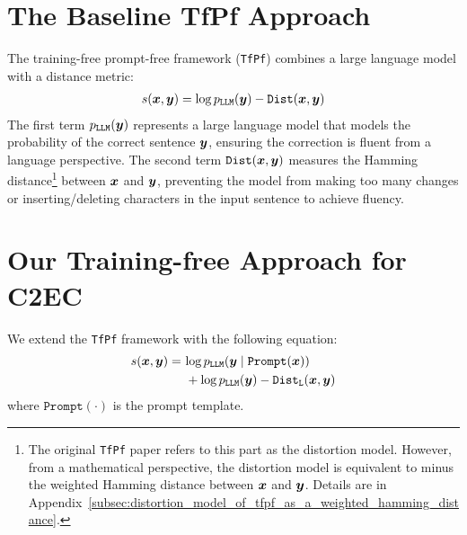 \section{The Baseline TfPf Approach}
\label{sec:baseline_tfpf_approach}
The training-free prompt-free framework (\texttt{TfPf}) \cite{zhou-etal-2024-simple} combines a large language model with a distance metric:
\begin{equation}
    \begin{aligned}
        s({\boldsymbol{x}}, {\boldsymbol{y}}) = \log p_{\mathtt{LLM}}({\boldsymbol{y}}) - \mathtt{Dist}({\boldsymbol{x}}, {\boldsymbol{y}})
        \label{eq:tfpf_score}
    \end{aligned}
\end{equation}
The first term $p_{\mathtt{LLM}}({\boldsymbol{y}})$ represents a large language model that models the probability of the correct sentence ${\boldsymbol{y}}$, ensuring the correction is fluent from a language perspective.
The second term $\mathtt{Dist}({\boldsymbol{x}}, {\boldsymbol{y}})$ measures the Hamming distance\footnote{The original \texttt{TfPf} paper refers to this part as the distortion model. However, from a mathematical perspective, the distortion model is equivalent to minus the weighted Hamming distance between ${\boldsymbol{x}}$ and ${\boldsymbol{y}}$. Details are in Appendix~\ref{subsec:distortion_model_of_tfpf_as_a_weighted_hamming_distance}.} between ${\boldsymbol{x}}$ and ${\boldsymbol{y}}$, preventing the model from making too many changes or inserting/deleting characters in the input sentence to achieve fluency.

\section{Our Training-free Approach for C2EC}
\label{sec:our_approach}

We extend the \texttt{TfPf} framework with the following equation:
\begin{equation}
    \begin{aligned}
        s({\boldsymbol{x}}, {\boldsymbol{y}}) =\  & {\log p_{\mathtt{LLM}}({\boldsymbol{y}}\mid \mathtt{Prompt}({\boldsymbol{x}}))}                         \\
                                            & + \log p_{\mathtt{LLM}}({\boldsymbol{y}}) - \mathtt{Dist}_{\mathtt{L}}({\boldsymbol{x}}, {\boldsymbol{y}})
        \label{eq:gcsc_score}
    \end{aligned}
\end{equation}
where $\mathtt{Prompt}(\cdot)$ is the prompt template.

